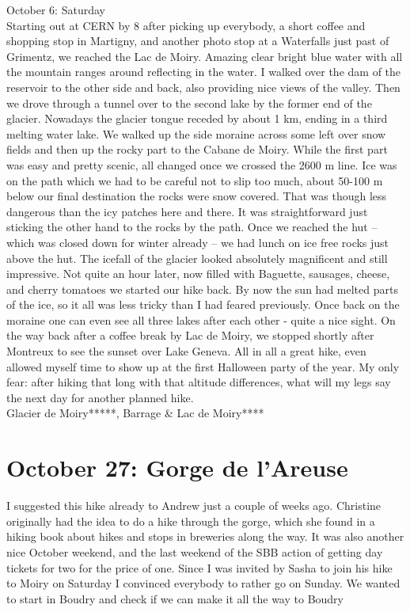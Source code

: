 October 6: Saturday\\
Starting out at CERN by 8 after picking up everybody, a short coffee and shopping stop in Martigny, and another photo stop at a Waterfalls just past of Grimentz, we reached the Lac de Moiry. Amazing clear bright blue water with all the mountain ranges around reflecting in the water. I walked over the dam of the reservoir to the other side and back, also providing nice views of the valley. Then we drove through a tunnel over to the second lake by the former end of the glacier. Nowadays the glacier tongue receded by about 1 km, ending in a third melting water lake. We walked up the side moraine across some left over snow fields and then up the rocky part to the Cabane de Moiry. While the first part was easy and pretty scenic, all changed once we crossed the 2600 m line. Ice was on the path which we had to be careful not to slip too much, about 50-100 m below our final destination the rocks were snow covered. That was though less dangerous than the icy patches here and there. It was straightforward just sticking the other hand to the rocks by the path. Once we reached the hut -- which was closed down for winter already -- we had lunch on ice free rocks just above the hut. The icefall of the glacier looked absolutely magnificent and still impressive. Not quite an hour later, now filled with Baguette, sausages, cheese, and cherry tomatoes we started our hike back. By now the sun had melted parts of the ice, so it all was less tricky than I had feared previously. Once back on the moraine one can even see all three lakes after each other - quite a nice sight. On the way back after a coffee break by Lac de Moiry, we stopped shortly after Montreux to see the sunset over Lake Geneva. All in all a great hike, even allowed myself time to show up at the first Halloween party of the year. My only fear: after hiking that long with that altitude differences, what will my legs say the next day for another planned hike.\\

Glacier de Moiry*****, Barrage \& Lac de Moiry****\\

\section{October 27: Gorge de l'Areuse}
\label{2019:gorgedelareuse}

I suggested this hike already to Andrew just a couple of weeks ago. Christine originally had the idea to do a hike through the gorge, which she found in a hiking book about hikes and stops in breweries along the way. It was also another nice October weekend, and the last weekend of the SBB action of getting day tickets for two for the price of one. Since I was invited by Sasha to join his hike to Moiry on Saturday I convinced everybody to rather go on Sunday. We wanted to start in Boudry and check if we can make it all the way to Boudry\\

